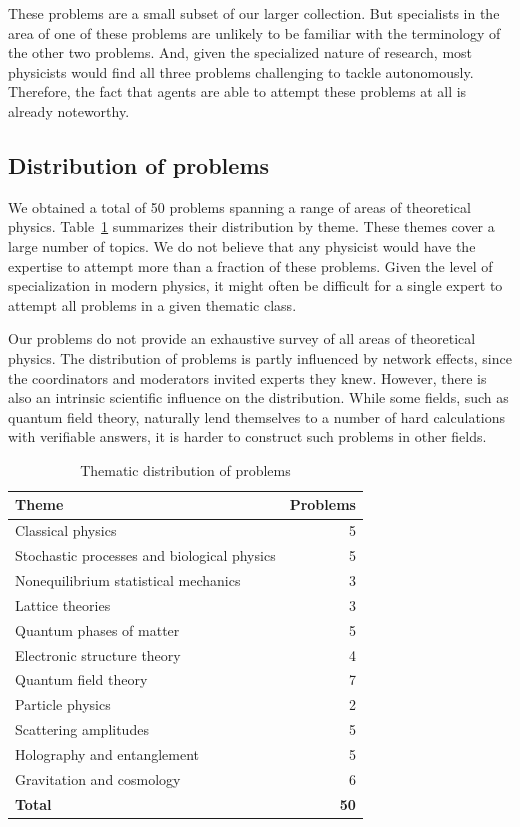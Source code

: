 \documentclass[aps,prd,reprint,superscriptaddress,nofootinbib]{revtex4-2}
\begin{document}
These problems are a small subset of our larger collection.  But specialists in the area of one of these problems are unlikely to be familiar with the terminology of the other two problems. And, given the specialized nature of research, most physicists would find all three problems challenging to tackle autonomously. Therefore, the fact that agents are able to attempt these problems at all is already noteworthy. 

\subsection{Distribution of problems}
We obtained a total of 50 problems spanning a range of areas of theoretical physics. Table~\ref{tab:problem-themes} summarizes their distribution by theme. These themes cover a large number of topics. We do not believe that any physicist would have the expertise to attempt more than a fraction of these problems. Given the level of specialization in modern physics, it might often be difficult for a single expert to attempt all problems in a given thematic class. 


Our problems do not provide an exhaustive survey of all areas of theoretical physics. The distribution of problems is partly influenced by network effects, since the coordinators and moderators invited experts they knew. However, there is also an intrinsic scientific influence on the distribution. While some fields, such as quantum field theory, naturally lend themselves to a number of hard calculations with verifiable answers, it is harder to construct such problems in other fields.

\begin{table}[htbp]
\small
\setlength{\tabcolsep}{4pt}
\renewcommand{\arraystretch}{1.1}
\begin{ruledtabular}
\begin{tabular}{p{}r}
\textbf{Theme} & \textbf{Problems} \\
\hline
\raggedright Classical physics & 5 \\
\raggedright Stochastic processes and biological physics & 5 \\
\raggedright Nonequilibrium statistical mechanics & 3 \\
\raggedright Lattice theories & 3 \\
\raggedright Quantum phases of matter & 5 \\
\raggedright Electronic structure theory & 4 \\
\raggedright Quantum field theory & 7 \\
\raggedright Particle physics & 2 \\
\raggedright Scattering amplitudes  & 5 \\
\raggedright Holography and entanglement & 5 \\
\raggedright Gravitation and cosmology & 6 \\
\hline
\textbf{Total} & \textbf{50} \\
\end{tabular}
\end{ruledtabular}
\caption{Thematic distribution of problems \label{tab:problem-themes}}
\end{table}
\end{document}
